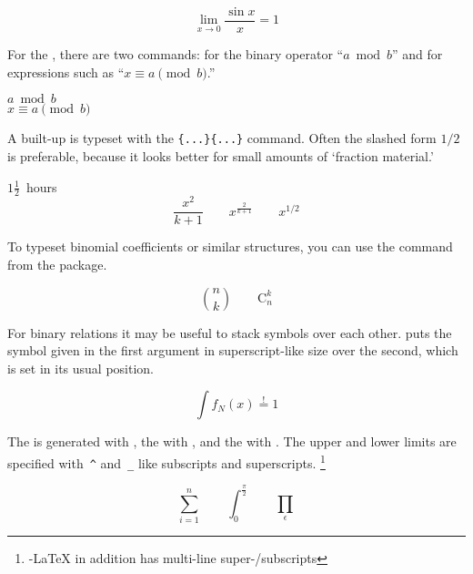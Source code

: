 \begin{example}
\[\lim_{x \rightarrow 0}
\frac{\sin x}{x}=1\]
\end{example}

For the , there are two commands:  for the
binary operator ``$a \bmod b$'' and 
for expressions
such as ``$x\equiv a \pmod{b}$.''
\begin{example}
$a\bmod b$\\
$x\equiv a \pmod{b}$
\end{example}

A built-up \textbf{} is typeset with the
\verb|{...}{...}| command.
Often the slashed form $1/2$ is preferable, because it looks better
for small amounts of `fraction material.'
\begin{example}
$1\frac{1}{2}$~hours
\begin{displaymath}
\frac{ x^{2} }{ k+1 }\qquad
x^{ \frac{2}{k+1} }\qquad
x^{ 1/2 }
\end{displaymath}
\end{example}

To typeset binomial coefficients or similar structures, you can use
the command  from the  package.

\begin{example}
\begin{displaymath}
\binom{n}{k}\qquad\mathrm{C}_n^k
\end{displaymath}
\end{example}

For binary relations it may be useful to stack symbols over each other.
 puts the symbol given
in the first argument in superscript-like size over the second, which
is set in its usual position.
\begin{example}
\begin{displaymath}
\int f_N(x) \stackrel{!}{=} 1
\end{displaymath}
\end{example}

The \textbf{} is generated with , the
\textbf{} with , and the \textbf{}
with . The upper and lower limits are specified with~\verb|^|
and~\verb|_| like subscripts and superscripts.
\footnote{\AmS-\LaTeX{} in addition has multi-line super-/subscripts}
\begin{example}
\begin{displaymath}
\sum_{i=1}^{n} \qquad
\int_{0}^{\frac{\pi}{2}} \qquad
\prod_\epsilon
\end{displaymath}
\end{example}


